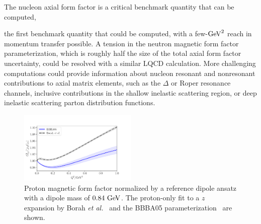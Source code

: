 The nucleon axial form factor is a critical benchmark quantity that can be computed,


the first benchmark quantity that could be computed, with a few-${\rm GeV}^2$ reach in momentum transfer possible.
A tension in the neutron magnetic form factor parameterization,
 which is roughly half the size of the total axial form factor uncertainty,
 could be resolved with a similar LQCD calculation.
More challenging computations could provide information about nucleon
 resonant and nonresonant contributions to axial matrix elements,
 such as the $\Delta$ or Roper resonance channels,
 inclusive contributions in the shallow inelastic scattering region,
 or deep inelastic scattering parton distribution functions.

\begin{figure}[hbt!]
 \centering
 \includegraphics[width=0.5\textwidth]{plots/proton_magnetic-standalone.pdf}
\caption{
 Proton magnetic form factor normalized by a reference dipole ansatz
 with a dipole mass of $0.84~{\rm GeV}$.
 The proton-only fit to a $z$ expansion by Borah {\it et al.}~\cite{Borah:2020gte}
 and the BBBA05 parameterization~\cite{Bradford:2006yz} are shown.
 \label{fig:protonmagneticff}
}
\end{figure}

